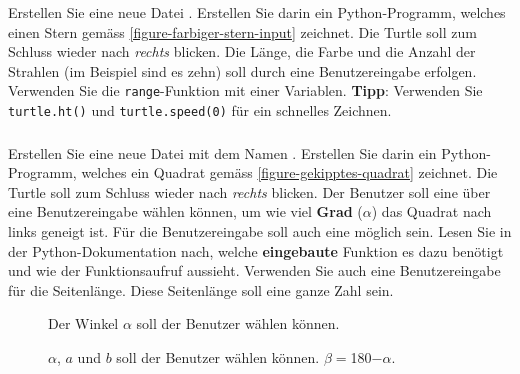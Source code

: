 \subsubsection{}

Erstellen Sie eine neue Datei . Erstellen Sie darin ein Python-Programm, welches einen Stern gemäss \autoref{figure-farbiger-stern-input} zeichnet. Die Turtle soll zum Schluss wieder nach \textit{rechts} blicken. Die Länge, die Farbe und die Anzahl der Strahlen (im Beispiel sind es zehn) soll durch eine Benutzereingabe erfolgen. Verwenden Sie die \lstinline{range}-Funktion mit einer Variablen. \textbf{Tipp}: Verwenden Sie \lstinline{turtle.ht()} und \lstinline{turtle.speed(0)} für ein schnelles Zeichnen.

\subsubsection{}

Erstellen Sie eine neue Datei mit dem Namen . Erstellen Sie darin ein Python-Programm, welches ein Quadrat gemäss \autoref{figure-gekipptes-quadrat} zeichnet. Die Turtle soll zum Schluss wieder nach \textit{rechts} blicken. Der Benutzer soll eine über eine Benutzereingabe wählen können, um wie viel \textbf{Grad} ($\alpha$) das Quadrat nach links geneigt ist. Für die Benutzereingabe soll auch eine  möglich sein. Lesen Sie in der Python-Dokumentation nach, welche \textbf{eingebaute} Funktion es dazu benötigt und wie der Funktionsaufruf aussieht. Verwenden Sie auch eine Benutzereingabe für die Seitenlänge. Diese Seitenlänge soll eine ganze Zahl sein.

\begin{figure}[htb]
\centering
\begin{minipage}[c]{0.45\linewidth}
\centering
{}
\caption{Der Winkel $\alpha$ soll der Benutzer wählen können.}
\label{figure-gekipptes-quadrat}
\end{minipage}
\hfill
\begin{minipage}[c]{0.45\linewidth}
\centering
{}
\caption{$\alpha$, $a$ und $b$ soll der Benutzer wählen können. $\beta = $\unit{180}{\degree}$ - \alpha$.}
\label{figure-parallelogramm}
\end{minipage}
\end{figure}

